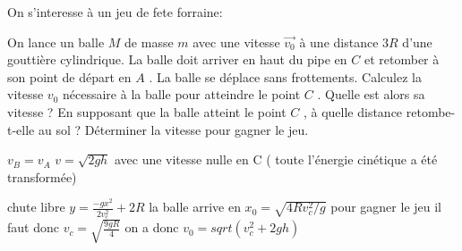\begin{Exercise}[title=]
  On s'interesse à un jeu de fete forraine:
  \begin{center}
  \end{center}
  \Question On lance un balle $M$ de masse $m$ avec une vitesse $\vec{v_0}$ à
  une distance $3R$ d'une gouttière cylindrique. La balle doit arriver en haut
  du pipe en $C$ et retomber à son point de départ en $A$ . La balle se déplace sans
  frottements.
  \Question Calculez la vitesse $v_0$ nécessaire à la balle pour atteindre le
  point $C$ . Quelle est alors sa vitesse ?
  \Question En supposant que la balle atteint le point $C$ , à quelle distance
  retombe-t-elle au sol ?
  \Question  Déterminer la vitesse pour gagner le jeu.
\end{Exercise}
\begin{Answer}
  \Question $v_B=v_A$
  \Question $v=\sqrt{2gh}$ avec une vitesse nulle en C ( toute l'énergie
  cinétique a été transformée)

  \Question chute libre $y=\frac{-gx^2}{2v_c^2}+2R$ la balle arrive en
  $x_0=\sqrt{4Rv_c^2/g}$
  \Question pour gagner le jeu il faut donc $v_c=\sqrt{\frac{9gR}{4}}$ on a donc
  $v_0=sqrt(v_c^2+2gh)$
\end{Answer}
